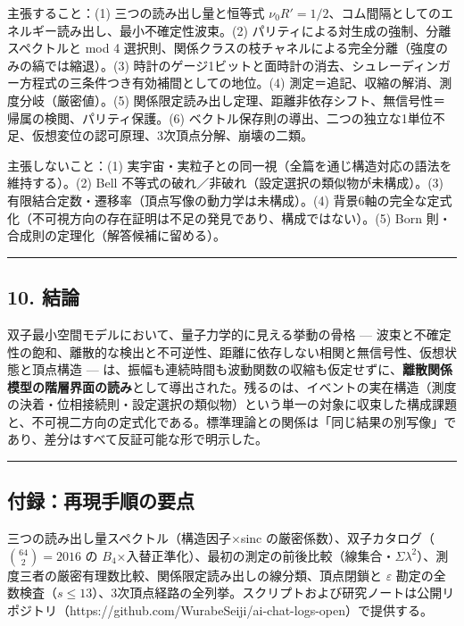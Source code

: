\documentclass[
]{ltjsarticle}
\begin{document}
主張すること：(1) 三つの読み出し量と恒等式
\(\nu_0R'=1/2\)、コム間隔としてのエネルギー読み出し、最小不確定性波束。(2)
パリティによる対生成の強制、分離スペクトルと mod 4
選択則、関係クラスの枝チャネルによる完全分離（強度のみの縞では縮退）。(3)
時計のゲージ1ビットと面時計の消去、シュレーディンガー方程式の三条件つき有効補間としての地位。(4)
測定＝追記、収縮の解消、測度分岐（厳密値）。(5)
関係限定読み出し定理、距離非依存シフト、無信号性＝帰属の検閲、パリティ保護。(6)
ベクトル保存則の導出、二つの独立な1単位不足、仮想変位の認可原理、3次頂点分解、崩壊の二類。

主張しないこと：(1)
実宇宙・実粒子との同一視（全篇を通じ構造対応の語法を維持する）。(2) Bell
不等式の破れ／非破れ（設定選択の類似物が未構成）。(3)
有限結合定数・遷移率（頂点写像の動力学は未構成）。(4)
背景6軸の完全な定式化（不可視方向の存在証明は不足の発見であり、構成ではない）。(5)
Born 則・合成則の定理化（解答候補に留める）。

\begin{center}\rule{0.5\linewidth}{0.5pt}\end{center}

\subsection{10. 結論}\label{ux7d50ux8ad6}

双子最小空間モデルにおいて、量子力学的に見える挙動の骨格 ---
波束と不確定性の飽和、離散的な検出と不可逆性、距離に依存しない相関と無信号性、仮想状態と頂点構造
---
は、振幅も連続時間も波動関数の収縮も仮定せずに、\textbf{離散関係模型の階層界面の読み}として導出された。残るのは、イベントの実在構造（測度の決着・位相接続則・設定選択の類似物）という単一の対象に収束した構成課題と、不可視二方向の定式化である。標準理論との関係は「同じ結果の別写像」であり、差分はすべて反証可能な形で明示した。

\begin{center}\rule{0.5\linewidth}{0.5pt}\end{center}

\subsection{付録：再現手順の要点}\label{ux4ed8ux9332ux518dux73feux624bux9806ux306eux8981ux70b9}

三つの読み出し量スペクトル（構造因子×sinc
の厳密係数）、双子カタログ（\(\binom{64}{2}=2016\) の
\(B_4\)×入替正準化）、最初の測定の前後比較（線集合・\(\Sigma\lambda^2\)）、測度三者の厳密有理数比較、関係限定読み出しの線分類、頂点閉鎖と
\(\varepsilon\)
勘定の全数検査（\(s\le13\)）、3次頂点経路の全列挙。スクリプトおよび研究ノートは公開リポジトリ（https://github.com/WurabeSeiji/ai-chat-logs-open）で提供する。
\end{document}
